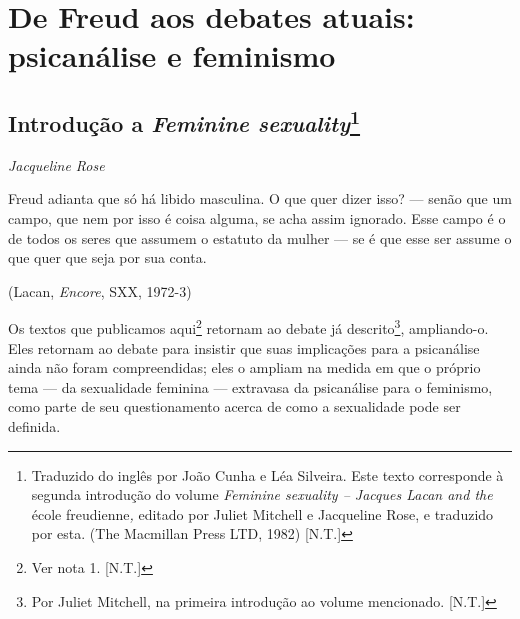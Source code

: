\part{De Freud aos debates atuais:\\ psicanálise e feminismo}


\chapter*{Introdução a \emph{Feminine sexuality}\footnote{Traduzido
  do inglês por João Cunha e Léa Silveira. Este texto corresponde à
  segunda introdução do volume \emph{Feminine sexuality -- Jacques Lacan
  and the} école freudienne\emph{,} editado por Juliet Mitchell e
  Jacqueline Rose, e traduzido por esta. (The Macmillan Press LTD, 1982)
  {[}N.T.{]}}}

\begin{flushright}
\emph{Jacqueline Rose}
\end{flushright}

\epigraph{Freud adianta que só há libido masculina. O que quer dizer isso? ---
senão que um campo, que nem por isso é coisa alguma, se acha assim
ignorado. Esse campo é o de todos os seres que assumem o estatuto da
mulher --- se é que esse ser assume o que quer que seja por sua conta.}{(Lacan, \emph{Encore}, SXX, 1972-3)}

Os textos que publicamos aqui\footnote{Ver nota 1. {[}N.T.{]}} retornam
ao debate já descrito\footnote{Por Juliet Mitchell, na primeira
  introdução ao volume mencionado. {[}N.T.{]}}, ampliando-o. Eles
retornam ao debate para insistir que suas implicações para a psicanálise
ainda não foram compreendidas; eles o ampliam na medida em que o próprio
tema --- da sexualidade feminina --- extravasa da psicanálise para o
feminismo, como parte de seu questionamento acerca de como a sexualidade
pode ser definida.

